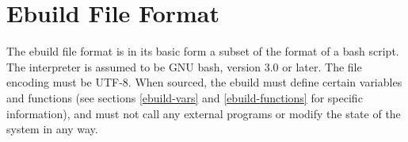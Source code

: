 \chapter{Ebuild File Format}
\label{ebuild-format}

The ebuild file format is in its basic form a subset of the format of a bash script. The interpreter
is assumed to be GNU bash, version 3.0 or later. The file encoding must be UTF-8. When sourced, the
ebuild must define certain variables and functions (see sections \ref{ebuild-vars} and
\ref{ebuild-functions} for specific information), and must not call any external programs or modify
the state of the system in any way.


